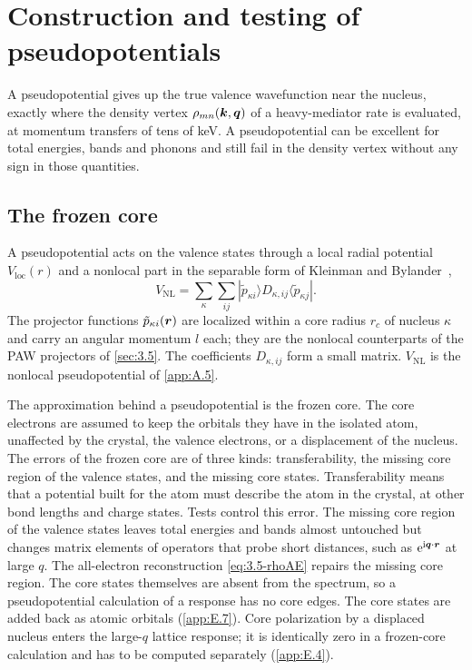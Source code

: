 \section{Construction and testing of pseudopotentials}\label{app:E.2}

A pseudopotential gives up the true valence wavefunction near the nucleus, exactly where the density vertex $\rho_{mn}(\bm{k}, \bm{q})$ of a heavy-mediator rate is evaluated, at momentum transfers of tens of keV. A pseudopotential can be excellent for total energies, bands and phonons and still fail in the density vertex without any sign in those quantities.

\subsection{The frozen core}

A pseudopotential acts on the valence states through a local radial potential $V_{\mathrm{loc}}(r)$ and a nonlocal part in the separable form of Kleinman and Bylander~\cite{kleinman1982efficacious},
\begin{equation}
  V_{\mathrm{NL}} = \sum_{\kappa}\sum_{ij}|\tilde p_{\kappa i}\rangle D_{\kappa,ij}\langle\tilde p_{\kappa j}| .
  \label{eq:E.2-KB}
\end{equation}
The projector functions $\tilde p_{\kappa i}(\bm{r})$ are localized within a core radius $r_c$ of nucleus $\kappa$ and carry an angular momentum $l$ each; they are the nonlocal counterparts of the PAW projectors of \cref{sec:3.5}. The coefficients $D_{\kappa,ij}$ form a small matrix. $V_{\mathrm{NL}}$ is the nonlocal pseudopotential of \cref{app:A.5}.

The approximation behind a pseudopotential is the frozen core. The core electrons are assumed to keep the orbitals they have in the isolated atom, unaffected by the crystal, the valence electrons, or a displacement of the nucleus. The errors of the frozen core are of three kinds: transferability, the missing core region of the valence states, and the missing core states. Transferability means that a potential built for the atom must describe the atom in the crystal, at other bond lengths and charge states. Tests control this error. The missing core region of the valence states leaves total energies and bands almost untouched but changes matrix elements of operators that probe short distances, such as $\mathrm{e}^{\mathrm{i}\bm{q}\cdot\bm{r}}$ at large $q$. The all-electron reconstruction \cref{eq:3.5-rhoAE} repairs the missing core region. The core states themselves are absent from the spectrum, so a pseudopotential calculation of a response has no core edges. The core states are added back as atomic orbitals (\cref{app:E.7}). Core polarization by a displaced nucleus enters the large-$q$ lattice response; it is identically zero in a frozen-core calculation and has to be computed separately (\cref{app:E.4}).


